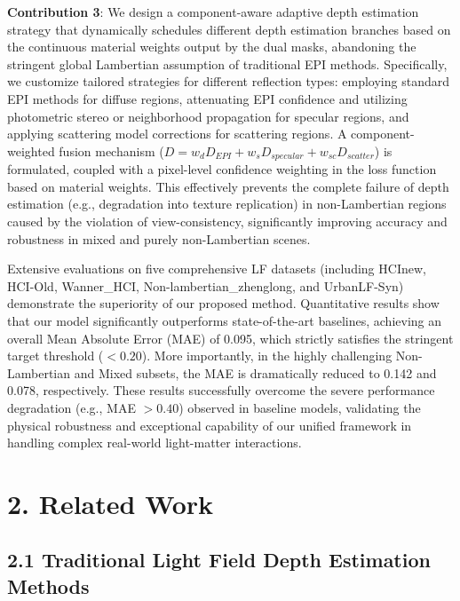 \documentclass[journal]{IEEEtran}
\begin{document}
\item \textbf{Contribution 3}: We design a component-aware adaptive depth estimation strategy that dynamically schedules different depth estimation branches based on the continuous material weights output by the dual masks, abandoning the stringent global Lambertian assumption of traditional EPI methods. Specifically, we customize tailored strategies for different reflection types: employing standard EPI methods for diffuse regions, attenuating EPI confidence and utilizing photometric stereo or neighborhood propagation for specular regions, and applying scattering model corrections for scattering regions. A component-weighted fusion mechanism (\(D = w_d D_{EPI} + w_s D_{specular} + w_{sc} D_{scatter}\)) is formulated, coupled with a pixel-level confidence weighting in the loss function based on material weights. This effectively prevents the complete failure of depth estimation (e.g., degradation into texture replication) in non-Lambertian regions caused by the violation of view-consistency, significantly improving accuracy and robustness in mixed and purely non-Lambertian scenes.

Extensive evaluations on five comprehensive LF datasets (including HCInew, HCI-Old, Wanner\_HCI, Non-lambertian\_zhenglong, and UrbanLF-Syn) demonstrate the superiority of our proposed method. Quantitative results show that our model significantly outperforms state-of-the-art baselines, achieving an overall Mean Absolute Error (MAE) of 0.095, which strictly satisfies the stringent target threshold (\(<0.20\)). More importantly, in the highly challenging Non-Lambertian and Mixed subsets, the MAE is dramatically reduced to 0.142 and 0.078, respectively. These results successfully overcome the severe performance degradation (e.g., MAE \(>0.40\)) observed in baseline models, validating the physical robustness and exceptional capability of our unified framework in handling complex real-world light-matter interactions.

\section{2. Related Work}

\subsection{2.1 Traditional Light Field Depth Estimation Methods}
\end{document}
